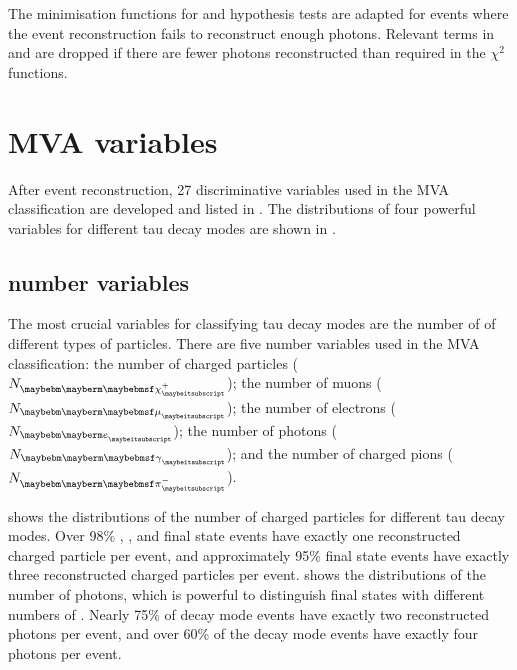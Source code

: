 
The  minimisation functions for \Prho and \Pai  hypothesis tests are adapted for events where the event reconstruction fails to reconstruct enough photons. Relevant terms in  and  are dropped if there are fewer photons reconstructed  than required in the $\chi^{2}$ functions.


\section{MVA variables}
\label{sec:tauVar}

After event reconstruction,  27 discriminative variables used in the MVA  classification  are  developed and listed in . The distributions of four powerful variables for different tau decay modes are shown in .


\subsection{\PFOs number variables}

The most crucial variables for classifying tau decay modes  are the number of \PFOs of different types of particles. There are five \PFOs number variables used in the MVA classification: the number of charged particles (${N}_{\charge}$); the number of muons (${N}_{\Pmu}$); the number of electrons (${N}_{\Pe}$); the number of photons (${N}_{\Pgg}$); and the number of charged pions (${N}_{\Pgpm}$).

 shows the distributions of the number of charged particles for different tau decay modes. Over 98\% \decayElectronShort, \decayMuonShort, and \decayPionShort final state events have exactly one reconstructed charged particle  per event, and approximately 95\% \decayAiPionShort final state events have exactly three reconstructed charged particles  per event.  shows the distributions of the number of photons, which is powerful to distinguish final states with different numbers of \Ppizero. Nearly 75\% of  \decayRhoShort decay mode events have exactly two reconstructed photons per event, and over 60\% of the \decayAiPhotonShort decay mode events have exactly four photons per event.

